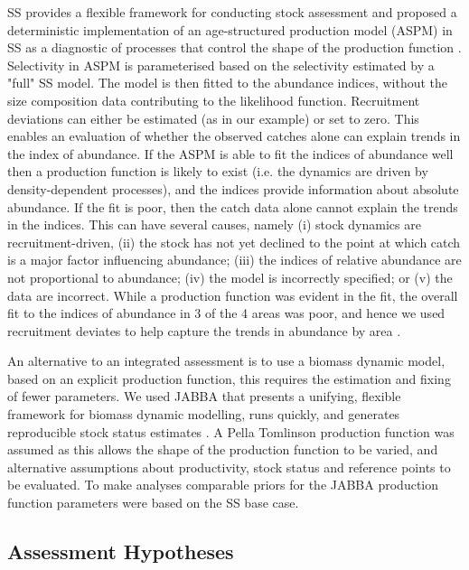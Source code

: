 \documentclass[12pt,halfline,a4paper,nonumbib]{ouparticle}
\begin{document}
SS provides a flexible framework for conducting stock assessment and \cite{maunder2015contemporary} proposed a deterministic implementation of an age-structured production model (ASPM) in SS as a diagnostic of processes that control the shape of the production function \parencite{carvalho2017can}. Selectivity in ASPM is parameterised based on the selectivity estimated by a "full" SS model. The model is then fitted to the abundance indices, without the size composition data contributing to the likelihood function. Recruitment deviations can either be estimated (as in our example) or set to zero. This enables an evaluation of whether the observed catches alone can explain trends in the index of abundance. If the ASPM is able to fit the indices of abundance well then a production function is likely to exist (i.e. the dynamics are driven by density-dependent processes), and the indices provide information about absolute abundance. If the fit is poor, then the catch data alone cannot explain the trends in the indices. This can have several causes, namely (i) stock dynamics are recruitment-driven, (ii) the stock has not yet declined to the point at which catch is a major factor influencing abundance; (iii) the indices of relative abundance are not proportional to abundance;  (iv) the model is incorrectly specified; or (v) the data are incorrect. While a production function was evident in the fit, the overall fit to the indices of abundance in 3 of the 4 areas was poor, and hence we used recruitment deviates to help capture the trends in abundance by area \cite[see][]{minte2017get}.

An alternative to an integrated assessment is to use a biomass dynamic model, based on an explicit production function, this requires the estimation and fixing of fewer parameters. We used JABBA that presents a unifying, flexible framework for biomass dynamic modelling, runs quickly, and generates reproducible stock status estimates \parencite{winker2018jabba}. A Pella Tomlinson production function \parencite{pella1969generalized} was assumed as this allows the shape of the production function to be varied, and alternative assumptions about productivity, stock status and reference points to be evaluated. To make analyses comparable priors for the JABBA production function parameters were based on the SS base case. 

\subsection{Assessment Hypotheses}
\end{document}
